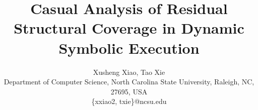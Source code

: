 \documentclass{sig-alternate}
\begin{document}
%
\title{Casual Analysis of Residual Structural Coverage in Dynamic Symbolic Execution}


\author{
Xusheng Xiao, \hspace{0.05in} Tao Xie\\
       \small{Department of Computer Science, North Carolina State University, Raleigh, NC, 27695, USA}\\
       \small{\{xxiao2, txie\}@ncsu.edu} 
}   


%







\maketitle









\end{document}
